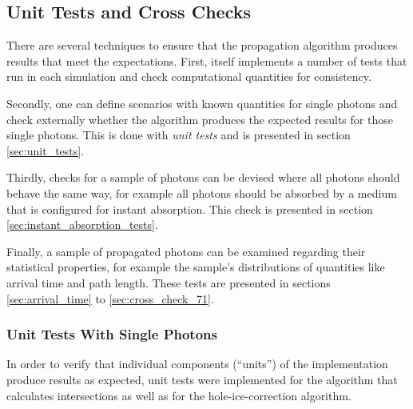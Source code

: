 \subsection{Unit Tests and Cross Checks}
\label{sec:unit_tests_and_cross_checks}

There are several techniques to ensure that the propagation algorithm
produces results that meet the expectations. First, \clsim itself
implements a number of tests that run in each simulation and check
computational quantities for consistency. \cite{clsimsource}

Secondly, one can define scenarios with known quantities for single
photons and check externally whether the algorithm produces the expected
results for those single photons. This is done with \textit{unit tests}
and is presented in section \ref{sec:unit_tests}.

Thirdly, checks for a sample of photons can be devised where all photons
should behave the same way, for example all photons should be absorbed
by a medium that is configured for instant absorption. This check is
presented in section \ref{sec:instant_absorption_tests}.

Finally, a sample of propagated photons can be examined regarding their
statistical properties, for example the sample's distributions of
quantities like arrival time and path length. These tests are presented
in sections \ref{sec:arrival_time} to \ref{sec:cross_check_71}.

\subsubsection{Unit Tests With Single
Photons}\label{unit-tests-with-single-photons}

\label{sec:unit_tests}

In order to verify that individual components (``units'') of the
implementation produce results as expected, unit tests were implemented
for the algorithm that calculates intersections as well as for the
hole-ice-correction algorithm.


